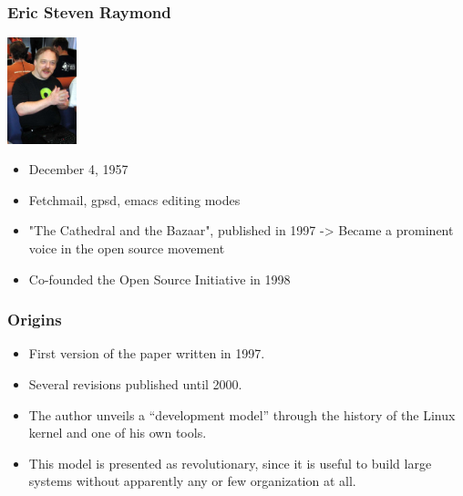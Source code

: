 \documentclass{beamer}
\begin{document}
\begin{frame}

\frametitle{Eric Steven Raymond}

\begin{center}
\includegraphics[width=2cm]{figs/EricrRaydmon.jpg}
\end{center}


\begin{itemize}
\item December 4, 1957
\item Fetchmail, gpsd, emacs editing modes
\item "The Cathedral and the Bazaar", published in 1997 -> Became a prominent voice in the open source movement 
\item Co-founded the Open Source Initiative in 1998

\end{itemize}

\end{frame}


\begin{frame}
\frametitle{Origins}

\begin{itemize}
\item First version of the paper written in 1997.
\item Several revisions published until 2000.
\item The author unveils a ``development model'' through the history
  of the Linux kernel and one of his own tools.
\item This model is presented as revolutionary, since it is useful to
  build large systems without apparently any or few organization at all.
\end{itemize}

\end{frame}
\end{document}
